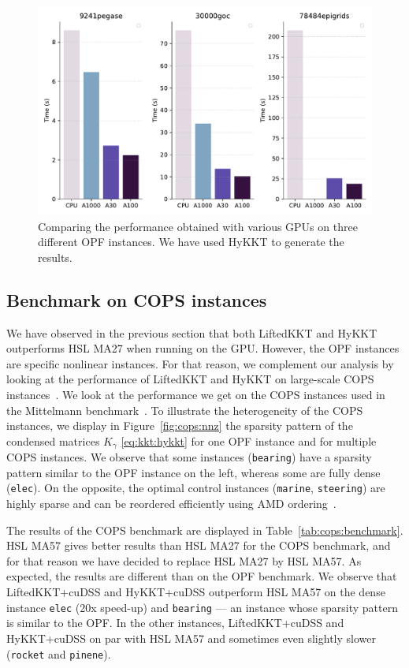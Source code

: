 \begin{figure}[!ht]
  \centering
  \includegraphics[width=.6\textwidth]{figures/benchmark_gpus.pdf}
  \caption{Comparing the performance obtained with various GPUs
    on three different OPF instances. We have used HyKKT to generate
    the results.
  \label{fig:gpubench}}
\end{figure}


\subsection{Benchmark on COPS instances}
\label{sec:num:cops}
We have observed in the previous section that both LiftedKKT
and HyKKT outperforms HSL MA27 when running on the GPU.
However, the OPF instances are specific nonlinear instances.
For that reason, we complement our analysis by looking
at the performance of LiftedKKT and HyKKT on large-scale COPS instances~\cite{dolan2004benchmarking}.
We look at the performance we get on the COPS instances used in
the Mittelmann benchmark~\cite{mittelmann2002benchmark}.
To illustrate the heterogeneity of the COPS instances,
we display in Figure~\ref{fig:cops:nnz} the sparsity pattern of the
condensed matrices $K_\gamma$ \eqref{eq:kkt:hykkt} for one OPF instance and for multiple
COPS instances. We observe that some instances ({\tt bearing}) have a sparsity pattern
similar to the OPF instance on the left, whereas some are fully dense ({\tt elec}).
On the opposite, the optimal control instances ({\tt marine}, {\tt steering}) are
highly sparse and can be reordered efficiently using AMD ordering~\cite{amestoy-david-duff-2004}.

The results of the COPS benchmark are displayed in Table~\ref{tab:cops:benchmark}.
HSL MA57 gives better results than HSL MA27 for the COPS benchmark, and
for that reason we have decided to replace HSL MA27 by HSL MA57. As expected,
the results are different than on the OPF benchmark.
We observe that LiftedKKT+cuDSS and HyKKT+cuDSS outperform HSL MA57 on the dense instance {\tt elec}
(20x speed-up) and {\tt bearing}  --- an instance whose sparsity pattern
is similar to the OPF. In the other instances, LiftedKKT+cuDSS and HyKKT+cuDSS
on par with HSL MA57 and sometimes even slightly slower ({\tt rocket} and {\tt pinene}).


